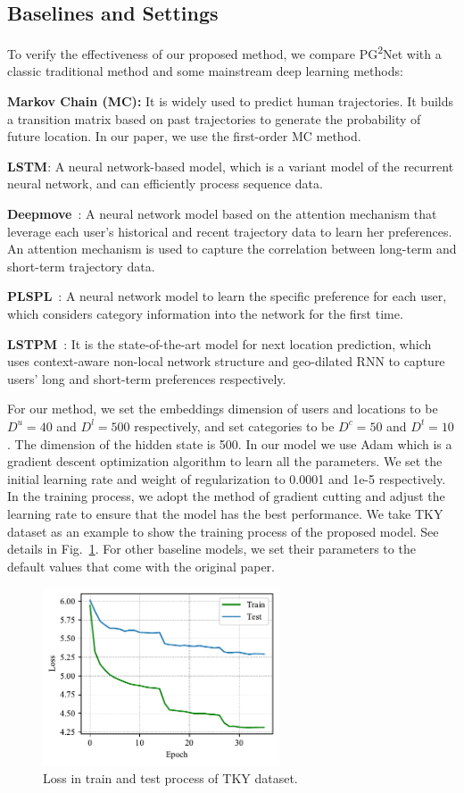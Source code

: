\documentclass[10pt,journal,compsoc]{IEEEtran}
\begin{document}
\subsection{\textbf{Baselines and Settings}}
To verify the effectiveness of our proposed method, we compare PG\textsuperscript{2}Net with a classic traditional method and some mainstream deep learning methods:

\textbf{Markov Chain (MC):} It is widely used to predict human trajectories. It builds a transition matrix based on past trajectories to generate the probability of future location. In our paper, we use the first-order MC method.

\textbf{LSTM}: A neural network-based model, which is a variant model of the recurrent neural network, and can efficiently process sequence data.

\textbf{Deepmove}~\cite{feng2018deepmove}: A neural network model based on the attention mechanism that leverage each user's historical and recent trajectory data to learn her preferences. An attention mechanism is used to capture the correlation between long-term and short-term trajectory data.

\textbf{PLSPL}~\cite{wu2020personalized}: A neural network model to learn the specific preference for each user, which considers category information into the network for the first time.

\textbf{LSTPM}~\cite{sun2020go}: It is the state-of-the-art model for next location prediction, which uses context-aware non-local network structure and geo-dilated RNN to capture users’ long and short-term preferences respectively. 

For our method, we set the embeddings dimension of users and locations to be $D^{u} = 40$ and $D^{l} = 500$ respectively, and set categories to be $D^{c} = 50$ and $D^{t} = 10$. The dimension of the hidden state is 500. In our model we use Adam which is a gradient descent optimization algorithm to learn all the parameters. We set the initial learning rate and weight of regularization to 0.0001 and 1e-5 respectively. In the training process, we adopt the method of gradient cutting and adjust the learning rate to ensure that the model has the best performance. We take TKY dataset as an example to show the training process of the proposed model. See details in Fig.~\ref{fig.11}. For other baseline models, we set their parameters to the default values that come with the original paper.

\begin{figure}[htpb]
    \centering
    \includegraphics[width=7cm]{figure/tky_loss.pdf}
    \caption{Loss in train and test process of TKY dataset.}
    \label{fig.11}
\end{figure}
\end{document}
